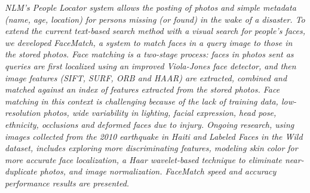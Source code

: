 
\begin{xpsectionbox}{}{}

\emph{\color{blue} NLM's People Locator \texttrademark system allows the posting of photos and simple metadata (name, age, location) for persons missing (or found) in the wake of a disaster. To extend the current text-based search method with a visual search for people's faces, we developed FaceMatch, a system to match faces in a query image to those in the stored photos.
	Face matching is a two-stage process: faces in photos sent as queries are first localized using an improved Viola-Jones face detector, and then image features (SIFT, SURF, ORB and HAAR) are extracted, combined and matched against an index of features extracted from the stored photos. 
Face matching in this context is challenging because of the lack of training data, low-resolution photos, wide variability in lighting, facial expression, head pose, ethnicity, occlusions and deformed faces due to injury.
	Ongoing research, using images collected from the 2010 earthquake in Haiti and Labeled Faces in the Wild dataset, includes exploring more discriminating features, modeling skin color for more accurate face localization, a Haar wavelet-based technique to eliminate near-duplicate photos, and image normalization. FaceMatch speed and accuracy performance results are presented.}

\end{xpsectionbox}

